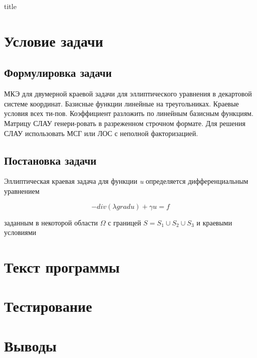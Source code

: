 \documentclass[12pt,a4paper]{article}
\begin{document}
    {title}

    \section{Условие задачи}                %
    \subsection*{Формулировка задачи}       %

    МКЭ для двумерной краевой задачи для эллиптического уравнения в декартовой
    системе координат. Базисные функции линейные на треугольниках. Краевые условия
    всех ти-пов. Коэффициент   разложить по линейным базисным функциям.
    Матрицу СЛАУ генери-ровать в разреженном строчном формате. Для решения
    СЛАУ использовать МСГ или ЛОС с неполной факторизацией.

    \subsection*{Постановка задачи}

    Эллиптическая краевая задача для функции \textit{u} определяется дифференциальным
    уравнением

    \[ -div( \lambda grad u) + \gamma u = f \]

    \noindent заданным в некоторой области $\Omega$ с границей
    $S=S_1 \cup S_2 \cup S_3$ и краевыми условиями

    \section{Текст программы}

    \section{Тестирование}

    \section{Выводы}
\end{document}
